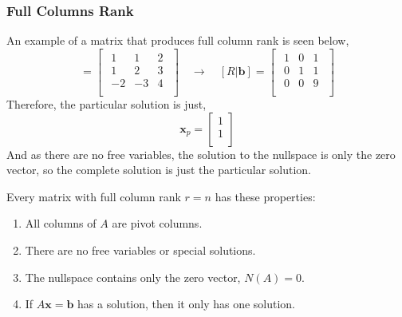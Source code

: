         \subsubsection{Full Columns Rank}
            An example of a matrix that produces full column rank is seen below,
            \begin{equation}
                [A|\boldsymbol{b}]=
                \begin{bmatrix}
                    \begin{array}{cc|c}
                        1 & 1 & 2 \\
                        1 & 2 & 3 \\
                        -2 & -3 & 4 \\
                    \end{array}
                \end{bmatrix} 
                \quad \rightarrow \quad [R|\boldsymbol{b}]=
                \begin{bmatrix}
                    \begin{array}{cc|c}
                        1 & 0 & 1 \\   
                        0 & 1 & 1 \\
                        0 & 0 & 9 \\
                    \end{array}
                \end{bmatrix}
            \end{equation}
            Therefore, the particular solution is just, 
            \begin{equation}
                \boldsymbol{x}_p = \begin{bmatrix}
                1 \\
                1 \\
                \end{bmatrix}
            \end{equation}
            And as there are no free variables, the solution to the nullspace is only the zero vector, so the complete 
            solution is just the particular solution.

            \par \hfill \break
            Every matrix with full column rank \( r=n \) has these properties:
            \begin{enumerate}
                \item All columns of \( A \) are pivot columns.
                \item There are no free variables or special solutions.
                \item The nullspace contains only the zero vector, \( N(A)=0 \).
                \item If \(A\boldsymbol{x}=\boldsymbol{b} \) has a solution, then it only has one solution.
            \end{enumerate}

